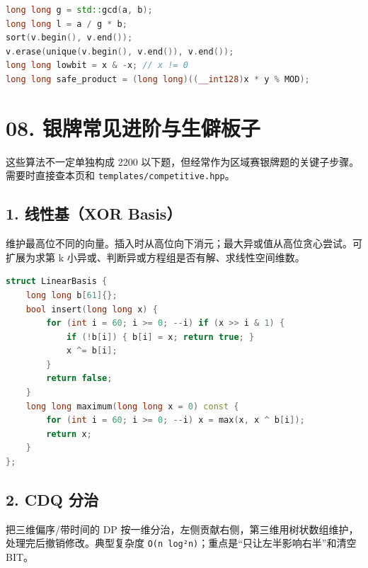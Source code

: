 \begin{lstlisting}[language={C++}]
long long g = std::gcd(a, b);
long long l = a / g * b;
sort(v.begin(), v.end());
v.erase(unique(v.begin(), v.end()), v.end());
long long lowbit = x & -x; // x != 0
long long safe_product = (long long)((__int128)x * y % MOD);
\end{lstlisting}

\chapter{08. 银牌常见进阶与生僻板子}\label{ux94f6ux724cux5e38ux89c1ux8fdbux9636ux4e0eux751fux50fbux677fux5b50}

这些算法不一定单独构成 2200 以下题，但经常作为区域赛银牌题的关键子步骤。需要时直接查本页和 \passthrough{\lstinline!templates/competitive.hpp!}。

\section{1. 线性基（XOR Basis）}\label{ux7ebfux6027ux57faxor-basis}

维护最高位不同的向量。插入时从高位向下消元；最大异或值从高位贪心尝试。可扩展为求第 k 小异或、判断异或方程组是否有解、求线性空间维数。

\begin{lstlisting}[language={C++}]
struct LinearBasis {
    long long b[61]{};
    bool insert(long long x) {
        for (int i = 60; i >= 0; --i) if (x >> i & 1) {
            if (!b[i]) { b[i] = x; return true; }
            x ^= b[i];
        }
        return false;
    }
    long long maximum(long long x = 0) const {
        for (int i = 60; i >= 0; --i) x = max(x, x ^ b[i]);
        return x;
    }
};
\end{lstlisting}

\section{2. CDQ 分治}\label{cdq-ux5206ux6cbb}

把三维偏序/带时间的 DP 按一维分治，左侧贡献右侧，第三维用树状数组维护，处理完后撤销修改。典型复杂度 \passthrough{\lstinline!O(n log²n)!}；重点是``只让左半影响右半''和清空 BIT。

